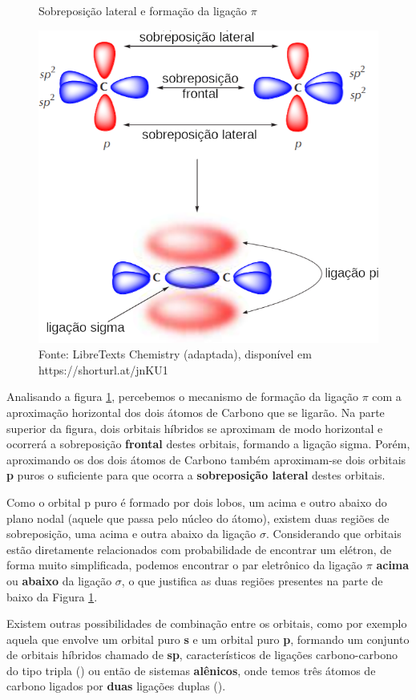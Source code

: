 \begin{figure}[h]
\centering
\caption{Sobreposição lateral e formação da ligação $\pi$}
\vspace{0.25cm}
\label{fig:sobre_lateral}
\includegraphics[width=0.75\linewidth]{imagens/sobre_lateral.png}
\caption*{Fonte: LibreTexts Chemistry (adaptada), disponível em https://shorturl.at/jnKU1}
\end{figure}

Analisando a figura \ref{fig:sobre_lateral}, percebemos o mecanismo de formação da ligação $\pi$ com a aproximação horizontal dos dois átomos de Carbono que se ligarão. Na parte superior da figura, dois orbitais híbridos se aproximam de modo horizontal e ocorrerá a sobreposição \textbf{frontal} destes orbitais, formando a ligação sigma. Porém, aproximando os dos dois átomos de Carbono também aproximam-se dois orbitais \textbf{p} puros o suficiente para que ocorra a \textbf{sobreposição lateral} destes orbitais.

Como o orbital p puro é formado por dois lobos, um acima e outro abaixo do plano nodal (aquele que passa pelo núcleo do átomo), existem duas regiões de sobreposição, uma acima e outra abaixo da ligação $\sigma$. Considerando que orbitais estão diretamente relacionados com probabilidade de encontrar um elétron, de forma muito simplificada, podemos encontrar o par eletrônico da ligação $\pi$ \textbf{acima} ou \textbf{abaixo} da ligação $\sigma$, o que justifica as duas regiões presentes na parte de baixo da Figura \ref{fig:sobre_lateral}.

Existem outras possibilidades de combinação entre os orbitais, como por exemplo aquela que envolve um orbital puro \textbf{s} e um orbital puro \textbf{p}, formando um conjunto de orbitais híbridos chamado de \textbf{sp}, característicos de ligações carbono-carbono do tipo tripla () ou então de sistemas \textbf{alênicos}, onde temos três átomos de carbono ligados por \textbf{duas} ligações duplas ().

